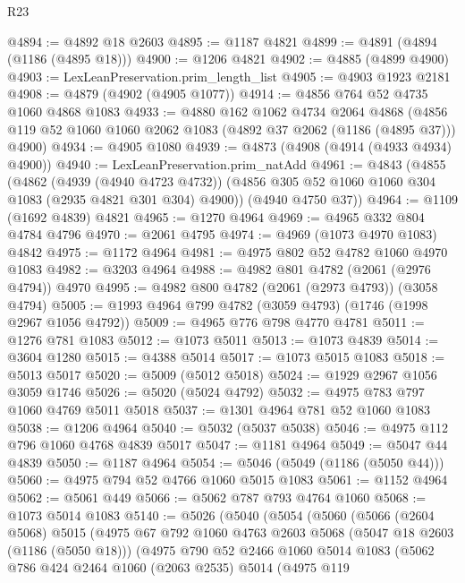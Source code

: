 \begin{lexlean}{R23}
\begin{coremodule}
@4894 := @4892 @18 @2603
@4895 := @1187 @4821
@4899 := @4891 (@4894 (@1186 (@4895 @18)))
@4900 := @1206 @4821
@4902 := @4885 (@4899 @4900)
@4903 := LexLeanPreservation.prim_length_list
@4905 := @4903 @1923 @2181
@4908 := @4879 (@4902 (@4905 @1077))
@4914 := @4856 @764 @52 @4735 @1060 @4868 @1083
@4933 := @4880
    @162
    @1062
    @4734
    @2064
    @4868
    (@4856 @119 @52 @1060 @1060 @2062 @1083 (@4892 @37 @2062 (@1186 (@4895 @37))) @4900)
@4934 := @4905 @1080
@4939 := @4873 (@4908 (@4914 (@4933 @4934) @4900))
@4940 := LexLeanPreservation.prim_natAdd
@4961 := @4843
    (@4855
      (@4862
        (@4939 (@4940 @4723 @4732))
        (@4856 @305 @52 @1060 @1060 @304 @1083 (@2935 @4821 @301 @304) @4900))
      (@4940 @4750 @37))
@4964 := @1109 (@1692 @4839) @4821
@4965 := @1270 @4964
@4969 := @4965 @332 @804 @4784 @4796
@4970 := @2061 @4795
@4974 := @4969 (@1073 @4970 @1083) @4842
@4975 := @1172 @4964
@4981 := @4975 @802 @52 @4782 @1060 @4970 @1083
@4982 := @3203 @4964
@4988 := @4982 @801 @4782 (@2061 (@2976 @4794)) @4970
@4995 := @4982 @800 @4782 (@2061 (@2973 @4793)) (@3058 @4794)
@5005 := @1993 @4964 @799 @4782 (@3059 @4793) (@1746 (@1998 @2967 @1056 @4792))
@5009 := @4965 @776 @798 @4770 @4781
@5011 := @1276 @781 @1083
@5012 := @1073 @5011
@5013 := @1073 @4839
@5014 := @3604 @1280
@5015 := @4388 @5014
@5017 := @1073 @5015 @1083
@5018 := @5013 @5017
@5020 := @5009 (@5012 @5018)
@5024 := @1929 @2967 @1056 @3059 @1746
@5026 := @5020 (@5024 @4792)
@5032 := @4975 @783 @797 @1060 @4769 @5011 @5018
@5037 := @1301 @4964 @781 @52 @1060 @1083
@5038 := @1206 @4964
@5040 := @5032 (@5037 @5038)
@5046 := @4975 @112 @796 @1060 @4768 @4839 @5017
@5047 := @1181 @4964
@5049 := @5047 @44 @4839
@5050 := @1187 @4964
@5054 := @5046 (@5049 (@1186 (@5050 @44)))
@5060 := @4975 @794 @52 @4766 @1060 @5015 @1083
@5061 := @1152 @4964
@5062 := @5061 @449
@5066 := @5062 @787 @793 @4764 @1060
@5068 := @1073 @5014 @1083
@5140 := @5026
    (@5040
      (@5054
        (@5060
          (@5066
            (@2604 @5068)
            @5015
            (@4975
              @67
              @792
              @1060
              @4763
              @2603
              @5068
              (@5047 @18 @2603 (@1186 (@5050 @18)))
              (@4975
                @790
                @52
                @2466
                @1060
                @5014
                @1083
                (@5062
                  @786
                  @424
                  @2464
                  @1060
                  (@2063 @2535)
                  @5014
                  (@4975
                    @119

\end{coremodule}
\end{lexlean}
